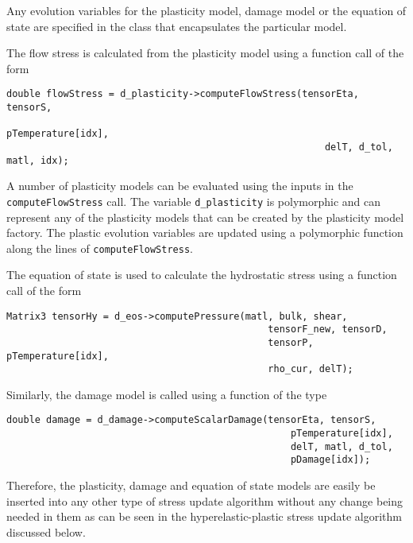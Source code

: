 Any evolution variables for the plasticity model, damage model or the
equation of state are specified in the class that encapsulates the
particular model.

The flow stress is calculated from the plasticity model using a
function call of the form
\begin{Verbatim}[fontsize=\footnotesize]
    double flowStress = d_plasticity->computeFlowStress(tensorEta, tensorS, 
                                                        pTemperature[idx],
                                                        delT, d_tol, matl, idx);
\end{Verbatim}
A number of plasticity models can be evaluated using the inputs in the
\verb+computeFlowStress+ call.  The variable \verb+d_plasticity+ is
polymorphic and can represent any of the plasticity models that can be
created by the plasticity model factory.  The plastic evolution variables
are updated using a polymorphic function along the lines of
\verb+computeFlowStress+.

The equation of state is used to calculate the hydrostatic stress using
a function call of the form
\begin{Verbatim}[fontsize=\footnotesize]
    Matrix3 tensorHy = d_eos->computePressure(matl, bulk, shear, 
                                              tensorF_new, tensorD, 
                                              tensorP, pTemperature[idx], 
                                              rho_cur, delT);
\end{Verbatim}

Similarly, the damage model is called using a function of the type
\begin{Verbatim}[fontsize=\footnotesize]
    double damage = d_damage->computeScalarDamage(tensorEta, tensorS, 
                                                  pTemperature[idx],
                                                  delT, matl, d_tol, 
                                                  pDamage[idx]);
\end{Verbatim}

Therefore, the plasticity, damage and equation of state models are
easily be inserted into any other type of stress update algorithm
without any change being needed in them as can be seen in the
hyperelastic-plastic stress update algorithm discussed below.


